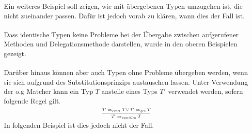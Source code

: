 \documentclass[a4paper,12pt]{article}
\begin{document}
\noindent
Ein weiteres Beispiel soll zeigen, wie mit übergebenen Typen umzugehen ist, die nicht zueinander passen. Dafür ist jedoch vorab zu klären, wann dies der Fall ist.\\\\
Dass identische Typen keine Probleme bei der Übergabe zwischen aufgerufener Methoden und Delegationsmethode darstellen, wurde in den oberen Beispielen gezeigt.\\\\
Darüber hinaus können aber auch Typen ohne Probleme übergeben werden, wenn sie sich aufgrund des Substitutionsprinzips austauschen lassen. Unter Verwendung der o.g Matcher kann ein Typ $T$ anstelle eines Typs $T'$ verwendet werden, sofern folgende Regel gilt.
\begin{gather*}
\frac{T' \Rightarrow_{exact} T \vee T' \Rightarrow_{gen} T}{T' \Rightarrow_{exactGen} T }
\end{gather*}
\noindent
In folgenden Beispiel ist dies jedoch nicht der Fall.
\end{document}
